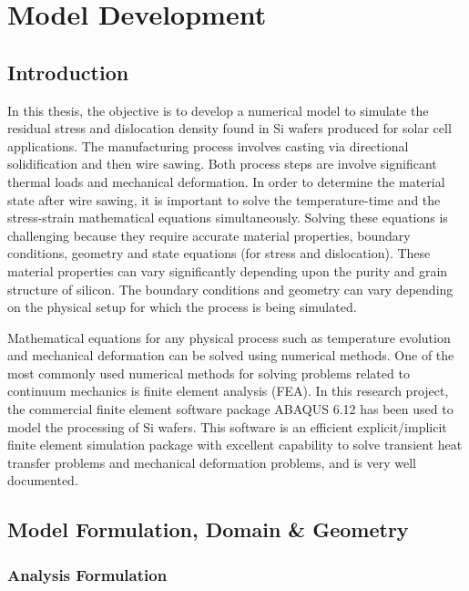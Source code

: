 \chapter{Model Development}
\section{Introduction}
In this thesis, the objective is to develop a numerical model to simulate the residual stress and  dislocation density found in Si wafers produced for solar cell applications. The manufacturing process involves casting via directional solidification and then wire sawing. Both process steps are involve significant thermal loads and mechanical deformation. In order to determine the material state after wire sawing, it is important to solve the temperature-time and the stress-strain mathematical equations simultaneously. Solving these equations is challenging because they require accurate material properties, boundary conditions, geometry and state equations (for stress and dislocation). These material properties can vary significantly depending upon the purity and grain structure of silicon. The boundary conditions and geometry can vary depending on the physical setup for which the process is being simulated. 

Mathematical equations for any physical process such as temperature evolution and mechanical deformation can be solved using numerical methods. One of the most commonly used numerical methods for solving problems related to continuum mechanics is finite element analysis (FEA). In this research project, the commercial finite element software package ABAQUS 6.12 has been used to model the processing of Si wafers. This software is an efficient explicit/implicit finite element simulation package with excellent capability to solve transient heat transfer problems and mechanical deformation problems, and is very well documented. 

\section{Model Formulation, Domain \& Geometry}


\subsection{Analysis Formulation}

